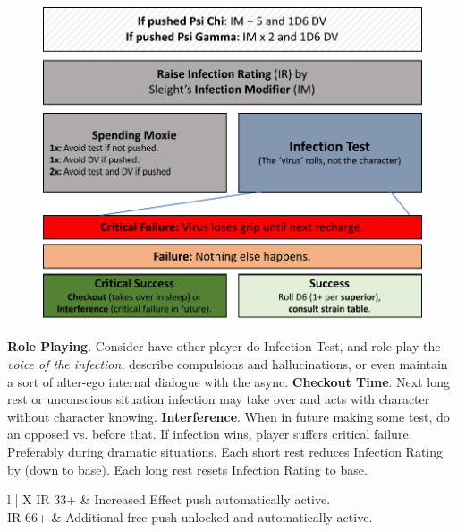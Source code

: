 \begin{figure}[H]%
   \centering
   \includegraphics[scale=0.75]{gfx/psi-infection}%
\end{figure}%

\bigskip

\begin{itemize}
    \itembox \textbf{Role Playing}. Consider have other player do Infection Test, and role play the \textit{voice of the infection}, describe compulsions and hallucinations, or even maintain a sort of alter-ego internal dialogue with the async.
    \itembox \textbf{Checkout Time}. Next long rest or unconscious situation infection may take over and acts with character without character knowing.
    \itembox \textbf{Interference}. When in future making some test, do an opposed  vs.  before that. If infection wins, player suffers critical failure. Preferably during dramatic situations.
    \itembox Each short rest reduces Infection Rating by  (down to base). Each long rest resets Infection Rating to base.
\end{itemize}

\bigskip

\begin{eptable}{ l | X }
   IR 33+ & Increased Effect push automatically active.\\
   IR 66+ & Additional free push unlocked and automatically active.\\
\end{eptable}

